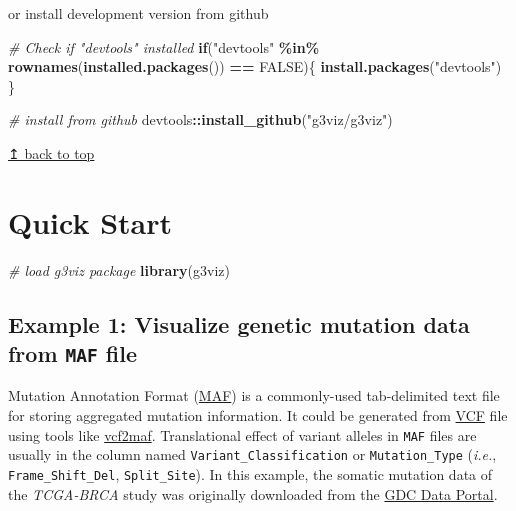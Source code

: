 \documentclass[
]{article}
\newenvironment{Shaded}{\begin{snugshade}}{\end{snugshade}}
\newcommand{\CommentTok}[1]{\textcolor[rgb]{0.56,0.35,0.01}{\textit{#1}}}
\newcommand{\ConstantTok}[1]{\textcolor[rgb]{0.56,0.35,0.01}{#1}}
\newcommand{\ControlFlowTok}[1]{\textcolor[rgb]{0.13,0.29,0.53}{\textbf{#1}}}
\newcommand{\FunctionTok}[1]{\textcolor[rgb]{0.13,0.29,0.53}{\textbf{#1}}}
\newcommand{\NormalTok}[1]{#1}
\newcommand{\SpecialCharTok}[1]{\textcolor[rgb]{0.81,0.36,0.00}{\textbf{#1}}}
\newcommand{\StringTok}[1]{\textcolor[rgb]{0.31,0.60,0.02}{#1}}
\begin{document}
or install development version from github

\begin{Shaded}
\begin{Highlighting}[]
\CommentTok{\# Check if "devtools" installed}
\ControlFlowTok{if}\NormalTok{(}\StringTok{"devtools"} \SpecialCharTok{\%in\%} \FunctionTok{rownames}\NormalTok{(}\FunctionTok{installed.packages}\NormalTok{()) }\SpecialCharTok{==} \ConstantTok{FALSE}\NormalTok{)\{ }
  \FunctionTok{install.packages}\NormalTok{(}\StringTok{"devtools"}\NormalTok{)}
\NormalTok{\}}

\CommentTok{\# install from github}
\NormalTok{devtools}\SpecialCharTok{::}\FunctionTok{install\_github}\NormalTok{(}\StringTok{"g3viz/g3viz"}\NormalTok{)}
\end{Highlighting}
\end{Shaded}

\hyperref[top]{↥ back to top}

\section{Quick Start}\label{quick-start}

\begin{Shaded}
\begin{Highlighting}[]
\CommentTok{\# load g3viz package}
\FunctionTok{library}\NormalTok{(g3viz)}
\end{Highlighting}
\end{Shaded}

\subsection{\texorpdfstring{Example 1: Visualize genetic mutation data
from \texttt{MAF}
file}{Example 1: Visualize genetic mutation data from MAF file}}\label{example-1-visualize-genetic-mutation-data-from-maf-file}

Mutation Annotation Format
(\href{https://docs.gdc.cancer.gov/Data/File_Formats/MAF_Format/}{MAF})
is a commonly-used tab-delimited text file for storing aggregated
mutation information. It could be generated from
\href{https://docs.gdc.cancer.gov/Data/File_Formats/VCF_Format/}{VCF}
file using tools like \href{https://github.com/mskcc/vcf2maf}{vcf2maf}.
Translational effect of variant alleles in \texttt{MAF} files are
usually in the column named \texttt{Variant\_Classification} or
\texttt{Mutation\_Type} (\emph{i.e.}, \texttt{Frame\_Shift\_Del},
\texttt{Split\_Site}). In this example, the somatic mutation data of the
\emph{TCGA-BRCA} study was originally downloaded from the
\href{https://portal.gdc.cancer.gov/projects/TCGA-BRCA}{GDC Data
Portal}.
\end{document}
